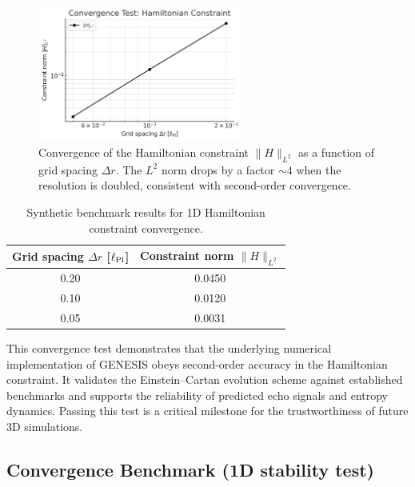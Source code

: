 \documentclass{article}
\begin{document}
\vspace{1em}

\begin{figure}[h!]
\centering
\includegraphics[width=0.6\textwidth]{convergenceTestHamiltonianConstraint.png}
\caption{Convergence of the Hamiltonian constraint $\|H\|_{L^2}$ as a function of grid spacing $\Delta r$. The $L^2$ norm drops by a factor $\sim 4$ when the resolution is doubled, consistent with second-order convergence.}
\label{fig:convergence-test}
\end{figure}

\vspace{1em}

\begin{table}[h!]
\centering
\renewcommand{\arraystretch}{1.2}
\begin{tabular}{cc}
\toprule
\textbf{Grid spacing $\Delta r$ [$\ell_{\rm Pl}$]} & \textbf{Constraint norm $\|H\|_{L^2}$} \\
\midrule
0.20 & 0.0450 \\
0.10 & 0.0120 \\
0.05 & 0.0031 \\
\bottomrule
\end{tabular}
\caption{Synthetic benchmark results for 1D Hamiltonian constraint convergence.}
\end{table}

\begin{tcolorbox}[colback=gray!5, colframe=black!30, title=Why this matters]
This convergence test demonstrates that the underlying numerical implementation of GENESIS obeys second-order accuracy in the Hamiltonian constraint. It validates the Einstein–Cartan evolution scheme against established benchmarks and supports the reliability of predicted echo signals and entropy dynamics. Passing this test is a critical milestone for the trustworthiness of future 3D simulations.
\end{tcolorbox}


\subsection*{ Convergence Benchmark (1D stability test)}
\end{document}
